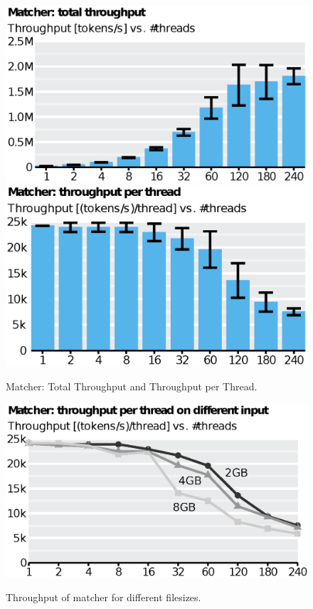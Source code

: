 \begin{figure}
      \includegraphics[scale=.45]{img/def/matcher_tp_total.eps}
      \includegraphics[scale=.45]{img/def/matcher_tp_per_thread.eps}
      \label{fig:matchertp}%
      \caption{Matcher: Total Throughput and Throughput per Thread.}
\end{figure}

\begin{figure}
    \includegraphics[scale=.45]{img/def/matcher_tp_compare.eps}
    \label{fig:tkmatchercomp}
    \caption{Throughput of matcher for different filesizes.}
\end{figure}


